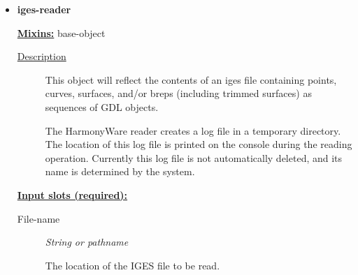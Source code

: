 \documentclass [11pt]{book}
\begin{document}
\begin{itemize}







\item {}
\label{prim:iges-reader}
\textbf{iges-reader}


\textbf{
\underline{Mixins:}} base-object





\begin{description}

\item [
\underline{Description}]


This object will reflect the contents of an iges file containing
points, curves, surfaces, and/or breps (including trimmed surfaces) as sequences of GDL objects. 

The HarmonyWare reader creates a log file in a temporary directory. The location of this log
file is printed on the console during the reading operation. Currently this log file is
not automatically deleted, and its name is determined by the system.





\end{description}








\textbf{
\underline{Input slots (required):}}

\begin{description}

\item [File-name]
\emph{String or pathname}

 The location of the IGES file to be read.




\end{description}







\end{itemize}
\end{document}
